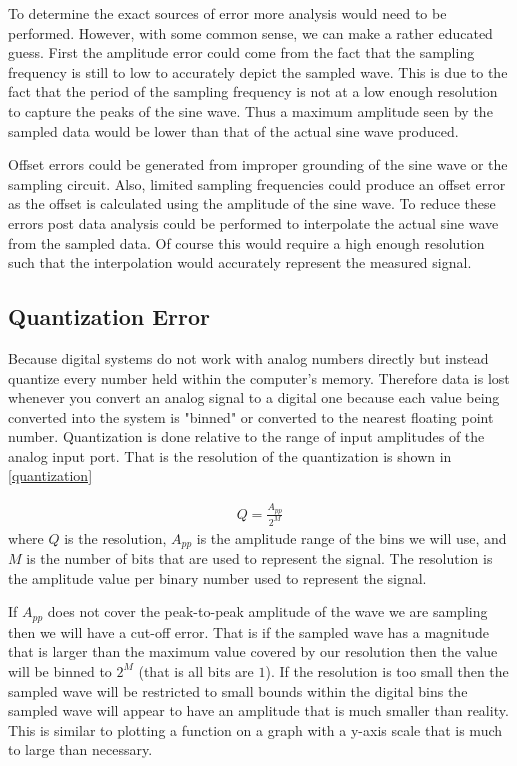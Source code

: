 \documentclass[main.tex]{subfile}
\begin{document}
To determine the exact sources of error more analysis would need to be
performed. However, with some common sense, we can make a rather educated guess.
First the amplitude error could come from the fact that the sampling frequency
is still to low to accurately depict the sampled wave. This is due to the fact
that the period of the sampling frequency is not at a low enough resolution to
capture the peaks of the sine wave. Thus a maximum amplitude seen by the sampled
data would be lower than that of the actual sine wave produced. 

Offset errors could be generated from improper grounding of the sine wave or the
sampling circuit. Also, limited sampling frequencies could produce an offset
error as the offset is calculated using the amplitude of the sine wave. To
reduce these errors post data analysis could be performed to interpolate the
actual sine wave from the sampled data. Of course this would require a high
enough resolution such that the interpolation would accurately represent the
measured signal.

\subsection{Quantization Error}
\label{sec:quantization_error}

Because digital systems do not work with analog numbers directly but instead
quantize every number held within the computer's memory. Therefore data is lost
whenever you convert an analog signal to a digital one because each value being
converted into the system is "binned" or converted to the nearest floating point
number. Quantization is done relative to the range of input amplitudes of the
analog input port. That is the resolution of the quantization is shown in
\eqref{quantization}

\begin{align}
	Q = \frac{A_{pp}}{2^M}\label{eq:quantization}
\end{align}
where $Q$ is the resolution, $A_{pp}$ is the amplitude range of the bins we will
use, and $M$ is the number of bits that are used to represent the signal. The
resolution is the amplitude value per binary number used to represent the
signal.

If $A_{pp}$ does not cover the peak-to-peak amplitude of the wave we are
sampling then we will have a cut-off error. That is if the sampled wave has a
magnitude that is larger than the maximum value covered by our resolution then
the value will be binned to $2^M$ (that is all bits are $1$). If the resolution
is too small then the sampled wave will be restricted to small bounds within the
digital bins the sampled wave will appear to have an amplitude that is much
smaller than reality. This is similar to plotting a function on a graph with a
y-axis scale that is much to large than necessary.
\end{document}
